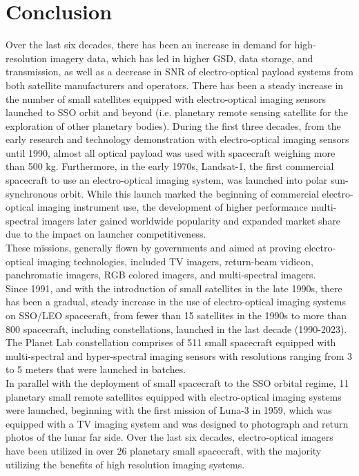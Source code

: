 \documentclass[final,5p,times,twocolumn]{elsarticle}
\begin{document}
\section{Conclusion}
Over the last six decades, there has been an increase in demand for high-resolution imagery data, which has led in higher GSD, data storage, and transmission, as well as a decrease in SNR of electro-optical payload systems from both satellite manufacturers and operators.  There has been a steady increase in the number of small satellites equipped with electro-optical imaging sensors launched to SSO orbit and beyond (i.e. planetary remote sensing satellite for the exploration of other planetary bodies). 
During the first three decades, from the early research and technology demonstration with electro-optical imaging sensors until 1990, almost all optical payload was used with spacecraft weighing more than 500 kg. Furthermore, in the early 1970s, Landsat-1, the first commercial spacecraft to use an electro-optical imaging system, was launched into polar sun-synchronous orbit. While this launch marked the beginning of commercial electro-optical imaging instrument use, the development of higher performance multi-spectral imagers later gained worldwide popularity and expanded market share due to the impact on launcher competitiveness.\\
These missions, generally flown by governments and aimed at proving electro-optical imaging technologies, included TV imagers, return-beam vidicon, panchromatic imagers, RGB colored imagers, and multi-spectral imagers.\\
Since 1991, and with the introduction of small satellites in the late 1990s, there has been a gradual, steady increase in the use of electro-optical imaging systems on SSO/LEO spacecraft, from fewer than 15 satellites in the 1990s to more than 800 spacecraft, including constellations, launched in the last decade (1990-2023).  The Planet Lab constellation comprises of 511 small spacecraft equipped with multi-spectral and hyper-spectral imaging sensors with resolutions ranging from 3 to 5 meters that were launched in batches. \\
In parallel with the deployment of small spacecraft to the SSO orbital regime, 11 planetary small remote satellites equipped with electro-optical imaging systems were launched, beginning with the first mission of Luna-3 in 1959, which was equipped with a TV imaging system and was designed to photograph and return photos of the lunar far side. Over the last six decades, electro-optical imagers have been utilized in over 26 planetary small spacecraft, with the majority utilizing the benefits of high resolution imaging systems. \\
\end{document}
